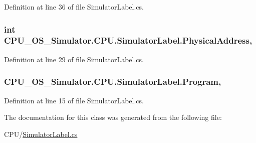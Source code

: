 Definition at line 36 of file Simulator\+Label.\+cs.

\hypertarget{class_c_p_u___o_s___simulator_1_1_c_p_u_1_1_simulator_label_a79e1920d572ce2003d032ba36bbc4e3a}{}
\subsubsection[{Physical\+Address}]{\setlength{\rightskip}{0pt plus 5cm}int C\+P\+U\+\_\+\+O\+S\+\_\+\+Simulator.\+C\+P\+U.\+Simulator\+Label.\+Physical\+Address\hspace{0.3cm}{\ttfamily [get]}, {\ttfamily [set]}}\label{class_c_p_u___o_s___simulator_1_1_c_p_u_1_1_simulator_label_a79e1920d572ce2003d032ba36bbc4e3a}


Definition at line 29 of file Simulator\+Label.\+cs.

\hypertarget{class_c_p_u___o_s___simulator_1_1_c_p_u_1_1_simulator_label_ab30b536a4ea675050256886bd467d03a}{}
\subsubsection[{Program}]{ C\+P\+U\+\_\+\+O\+S\+\_\+\+Simulator.\+C\+P\+U.\+Simulator\+Label.\+Program\hspace{0.3cm}{\ttfamily [get]}, {\ttfamily [set]}}\label{class_c_p_u___o_s___simulator_1_1_c_p_u_1_1_simulator_label_ab30b536a4ea675050256886bd467d03a}


Definition at line 15 of file Simulator\+Label.\+cs.



The documentation for this class was generated from the following file\+:\begin{DoxyCompactItemize}
\item 
C\+P\+U/\hyperlink{_simulator_label_8cs}{Simulator\+Label.\+cs}\end{DoxyCompactItemize}
